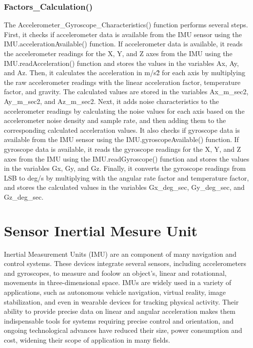 \subsection{Factors\_Calculation()}
The Accelerometer\_Gyroscope\_Characteristics() function performs several steps. First, it checks if accelerometer data is available from the IMU sensor using the IMU.accelerationAvailable() function. If accelerometer data is available, it reads the accelerometer readings for the X, Y, and Z axes from the IMU using the IMU.readAcceleration() function and stores the values in the variables Ax, Ay, and Az. Then, it calculates the acceleration in m/s\^2 for each axis by multiplying the raw accelerometer readings with the linear acceleration factor, temperature factor, and gravity. The calculated values are stored in the variables Ax\_m\_sec2, Ay\_m\_sec2, and Az\_m\_sec2. Next, it adds noise characteristics to the accelerometer readings by calculating the noise values for each axis based on the accelerometer noise density and sample rate, and then adding them to the corresponding calculated acceleration values. It also checks if gyroscope data is available from the IMU sensor using the IMU.gyroscopeAvailable() function. If gyroscope data is available, it reads the gyroscope readings for the X, Y, and Z axes from the IMU using the IMU.readGyroscope() function and stores the values in the variables Gx, Gy, and Gz. Finally, it converts the gyroscope readings from LSB to deg/s by multiplying with the angular rate factor and temperature factor, and stores the calculated values in the variables Gx\_deg\_sec, Gy\_deg\_sec, and Gz\_deg\_sec.

\chapter{Sensor Inertial Mesure Unit}

Inertial Measurement Units (IMU) are an component of many navigation and control systems. These devices integrate several sensors, including accelerometers and gyroscopes, to measure and foolow an object's, linear and rotationnal, movements in three-dimensional space. IMUs are widely used in a variety of applications, such as autonomous vehicle navigation, virtual reality, image stabilization, and even in wearable devices for tracking physical activity. Their ability to provide precise data on linear and angular acceleration makes them indispensable tools for systems requiring precise control and orientation, and ongoing technological advances have reduced their size, power consumption and cost, widening their scope of application in many fields. \cite{STMicroelectronics:2015}


